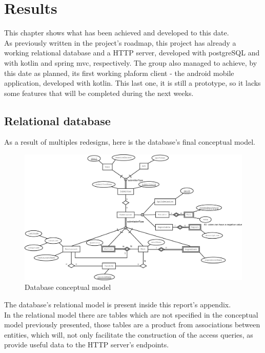 %
%
\chapter{Results}

This chapter shows what has been achieved and developed to this date.\\

As previously written in the project's roadmap, this project has already a working relational database
and a HTTP server, developed with postgreSQL and with kotlin and spring mvc, respectively. The group also
managed to achieve, by this date as planned, its first working plaform client - the android mobile application, developed
with kotlin. This last one, it is still a prototype, so it lacks some features that will be completed during the next weeks.

\section{Relational database}

As a result of multiples redesigns, here is the database's final conceptual model.

\begin{figure}[H]    
    \includegraphics[scale=0.25]{_figures/Nutr.io_Database_Diagram.eps}
    \caption{Database conceptual model}
\end{figure}

\newpage
The database's relational model is present inside this report's appendix.\\

In the relational model there are tables which are not specified in the conceptual model previously presented,
those tables are a product from associations between entities, which will, not only facilitate the construction of the access queries,
as provide useful data to the HTTP server's endpoints.\\

